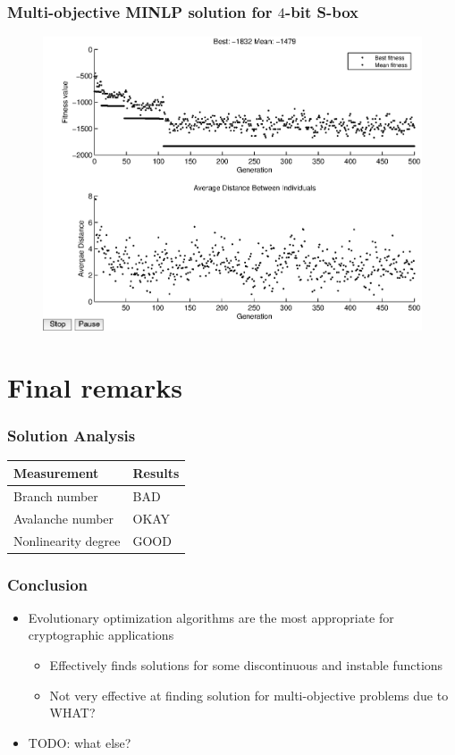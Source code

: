 \documentclass[handout]{beamer}
\begin{document}
\begin{frame}
	\frametitle{Multi-objective MINLP solution for $4$-bit S-box}
\begin{figure}
	\centering
	\includegraphics[scale=0.5]{images/joint_results16.eps} 
\end{figure}
\end{frame}

\section{Final remarks}
\begin{frame}
	\frametitle{Solution Analysis}
\begin{table}
    \begin{tabular}{|l|l|}
        \hline
        \textbf{Measurement} & \textbf{Results} \\ \hline
        Branch number & BAD \\ 
        Avalanche number & OKAY \\ 
        Nonlinearity degree & GOOD \\
        \hline
    \end{tabular}
\end{table}
\end{frame}

\begin{frame}
	\frametitle{Conclusion}
	\begin{itemize}
		\item Evolutionary optimization algorithms are the most appropriate for cryptographic applications
		\begin{itemize}
			\item Effectively finds solutions for some discontinuous and instable functions
			\item Not very effective at finding solution for multi-objective problems due to WHAT?
		\end{itemize}
		\item TODO: what else?
	\end{itemize}
\end{frame}
\end{document}
